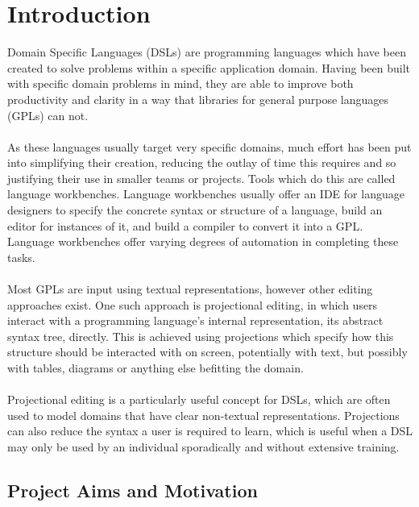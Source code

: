 \documentclass{article}
\begin{document}

\clearpage
\tableofcontents
\clearpage

\section{Introduction}

Domain Specific Languages (DSLs) are programming languages which have been created to solve problems within a specific application domain. Having been built with specific domain problems in mind, they are able to improve both productivity and clarity in a way that libraries for general purpose languages (GPLs) can not. 
\\
\\
As these languages usually target very specific domains, much effort has been put into simplifying their creation, reducing the outlay of time this requires and so justifying their use in smaller teams or projects. Tools which do this are called language workbenches. Language workbenches usually offer an IDE for language designers to specify the concrete syntax or structure of a language, build an editor for instances of it, and build a compiler to convert it into a GPL. Language workbenches offer varying degrees of automation in completing these tasks.
\\
\\
Most GPLs are input using textual representations, however other editing approaches exist. One such approach is projectional editing, in which users interact with a programming language's internal representation, its abstract syntax tree, directly. This is achieved using projections which specify how this structure should be interacted with on screen, potentially with text, but possibly with tables, diagrams or anything else befitting the domain. 
\\
\\
Projectional editing is a particularly useful concept for DSLs, which are often used to model domains that have clear non-textual representations. Projections can also reduce the syntax a user is required to learn, which is useful when a DSL may only be used by an individual sporadically and without extensive training.

\subsection{Project Aims and Motivation}
\end{document}
